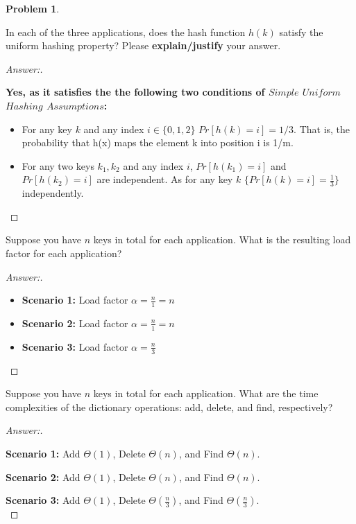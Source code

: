 \documentclass[11pt]{article}
\theoremstyle{definition}
\theoremstyle{definition}
\newtheorem{required}{Problem}
\theoremstyle{definition}
\begin{document}
\begin{required}
\begin{enumerate}[label=(\alph*)]
\newpage

\item In each of the three applications, does the hash function $h(k)$ satisfy the uniform hashing property? Please {\bf explain/justify} your answer.

\begin{proof}[Answer:] \
\item \textbf{Yes, as it satisfies the the following two conditions of $Simple$ $Uniform$ $Hashing$ $Assumptions$:}
\begin{itemize}
\item For any key $k$ and any index $i \in \{0, 1, 2\}$ $Pr[h(k) = i] = 1/3$. That is, the probability that h(x) maps the element k into position i is 1/m.
\item For any two keys $k_1, k_2$ and any index $i$, $Pr[h(k_1) = i]$ and $Pr[h(k_2) = i]$ are independent. As for any key $k$ $\{Pr[h(k) = i] = \frac{1}{3}\}$ independently.
\end{itemize}
\end{proof}

\newpage

\item Suppose you have $n$ keys in total for each application. What is the resulting load factor for each application?

\begin{proof}[Answer:] \
\begin{itemize}
\item \textbf{Scenario 1:} Load factor $\alpha = \frac{n}{1} = n$ \\
\item \textbf{Scenario 2:} Load factor $\alpha = \frac{n}{1} = n$ \\
\item \textbf{Scenario 3:} Load factor $\alpha = \frac{n}{3}$ \\
\end{itemize}
\end{proof}

\newpage

\item Suppose you have $n$ keys in total for each application. What are the time complexities of the dictionary operations: add, delete, and find, respectively?

\begin{proof}[Answer:] \
\item \textbf{Scenario 1:} Add $\Theta(1)$, Delete $\Theta(n)$, and Find $\Theta(n)$. \\
\item \textbf{Scenario 2:} Add $\Theta(1)$, Delete $\Theta(n)$, and Find $\Theta(n)$. \\
\item \textbf{Scenario 3:} Add $\Theta(1)$, Delete $\Theta(\frac{n}{3})$, and Find $\Theta(\frac{n}{3})$. \\
\end{proof}

\end{enumerate}
\end{required}
\end{document}
